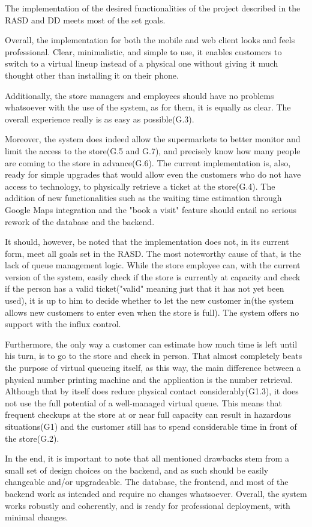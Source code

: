 The implementation of the desired functionalities of the project described in the RASD and DD meets most of the set goals. 

Overall, the implementation for both the mobile and web client looks and feels professional. Clear, minimalistic, and simple to use, it enables customers to switch to a virtual lineup instead of a physical one without giving it much thought other than installing it on their phone. 

Additionally, the store managers and employees should have no problems whatsoever with the use of the system, as for them, it is equally as clear. The overall experience really is as easy as possible(G.3). 

Moreover, the system does indeed allow the supermarkets to better monitor and limit the access to the store(G.5 and G.7), and precisely know how many people are coming to the store in advance(G.6). The current implementation is, also, ready for simple upgrades that would allow even the customers who do not have access to technology, to physically retrieve a ticket at the store(G.4). The addition of new functionalities such as the waiting time estimation through Google Maps integration and the "book a visit" feature should entail no serious rework of the database and the backend. 

 

It should, however, be noted that the implementation does not, in its current form, meet all goals set in the RASD. The most noteworthy cause of that, is the lack of queue management logic. While the store employee can, with the current version of the system, easily check if the store is currently at capacity and check if the person has a valid ticket("valid" meaning just that it has not yet been used), it is up to him to decide whether to let the new customer in(the system allows new customers to enter even when the store is full). The system offers no support with the influx control. 

Furthermore, the only way a customer can estimate how much time is left until his turn, is to go to the store and check in person. That almost completely beats the purpose of virtual queueing itself, as this way, the main difference between a physical number printing machine and the application is the number retrieval. Although that by itself  does reduce physical contact considerably(G1.3), it does not use the full potential of a well-managed virtual queue. This means that frequent checkups at the store at or near full capacity can result in hazardous situations(G1) and the customer still has to spend considerable time in front of the store(G.2). 

 

In the end, it is important to note that all mentioned drawbacks stem from a small set of design choices on the backend, and as such should be easily changeable and/or upgradeable. The database, the frontend, and most of the backend work as intended and require no changes whatsoever. Overall, the system works robustly and coherently, and is ready for professional deployment, with minimal changes. 